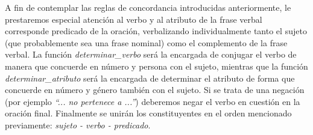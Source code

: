 \noindent
A fin de contemplar las reglas de concordancia introducidas anteriormente, le prestaremos especial atención al verbo y al atributo de la frase verbal corresponde predicado de la oración, verbalizando individualmente tanto el sujeto (que probablemente sea una frase nominal) como el complemento de la frase verbal. La función \emph{determinar\_verbo} será la encargada de conjugar el verbo de manera que concuerde en número y persona con el sujeto, mientras que la función \emph{determinar\_atributo} será la encargada de determinar el atributo de forma que concuerde en número y género también con el sujeto. Si se trata de una negación (por ejemplo \emph{``... no pertenece a ...''}) deberemos negar el verbo en cuestión en la oración final. Finalmente se unirán los constituyentes en el orden mencionado previamente: \emph{sujeto - verbo - predicado}.
